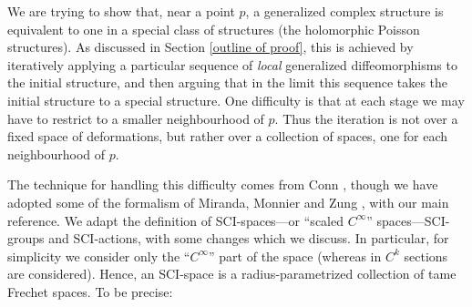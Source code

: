\documentclass{article}
\begin{document}
We are trying to show that, near a point $p$, a generalized complex structure is equivalent to one in a special class of structures (the holomorphic Poisson structures).  As discussed in Section \ref{outline of proof}, this is achieved by iteratively applying a particular sequence of \emph{local} generalized diffeomorphisms to the initial structure, and then arguing that in the limit this sequence takes the initial structure to a special structure.  One difficulty is that at each stage we may have to restrict to a smaller neighbourhood of $p$.  Thus the iteration is not over a fixed space of deformations, but rather over a collection of spaces, one for each neighbourhood of $p$.

The technique for handling this difficulty comes from Conn \cite{Conn}, though we have adopted some of the formalism of Miranda, Monnier and Zung \cite{MonnierZung} \cite{MirandaMonnierZung}, with \cite[Section 6 and Appendices A and B]{MirandaMonnierZung} our main reference.  We adapt the definition of SCI-spaces---or ``scaled $C^\infty$'' spaces---SCI-groups and SCI-actions, with some changes which we discuss.  In particular, for simplicity we consider only the ``$C^\infty$'' part of the space (whereas in \cite{MirandaMonnierZung} $C^k$ sections are considered).  Hence, an SCI-space is a radius-parametrized collection of tame Frechet spaces.  To be precise:
\end{document}

